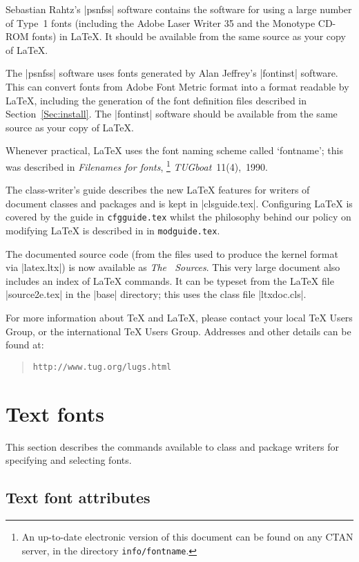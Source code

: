 \documentclass{ltxguide}[1995/11/28]
\begin{document}
Sebastian Rahtz's |psnfss| software contains the software for using a
large number of Type~1 fonts (including the Adobe Laser Writer 35 and
the Monotype CD-ROM fonts) in \LaTeX.  It should be available from the
same source as your copy of \LaTeX.

The |psnfss| software uses fonts generated by Alan Jeffrey's |fontinst|
software.  This can convert fonts from Adobe Font Metric format into a
format readable by \LaTeX, including the generation of the font
definition files described in Section~\ref{Sec:install}.  The |fontinst|
software should be available from the same source as your copy of
\LaTeX.

Whenever practical, \LaTeX{} uses the font naming scheme called
`fontname'; this was described in \emph{Filenames for fonts},%
\footnote{An up-to-date electronic version of this document can be found
  on any CTAN server, in the directory \texttt{info/fontname}.}
\emph{TUGboat}~11(4),~1990.

The class-writer's guide \emph{\clsguide} describes the new \LaTeX{}
features for writers of document classes and packages and is kept in
|clsguide.tex|. Configuring \LaTeX{} is covered by the guide
\emph{\cfgguide} in \texttt{cfgguide.tex} whilst the philosophy behind
our policy on modifying \LaTeX{} is described in \emph{\modguide} in
\texttt{modguide.tex}.

The documented source code (from the files used to produce the kernel
format via |latex.ltx|) is now available as \emph{The \LaTeXe\ Sources}.
This very large document also includes an index of \LaTeX{} commands.
It can be typeset from the \LaTeX{} file |source2e.tex| in the |base|
directory; this uses the class file |ltxdoc.cls|.

For more information about \TeX{} and \LaTeX{}, please contact your
local \TeX{} Users Group, or the international \TeX{} Users Group.
Addresses and other details can be found at:
\begin{quote}\small\label{addrs}
  \texttt{http://www.tug.org/lugs.html}
\end{quote}


\section{Text fonts}
\label{Sec:text}

This section describes the commands available to class and package
writers for specifying and selecting fonts.

\subsection{Text font attributes}
\label{sec:textfontattributes}
\end{document}
